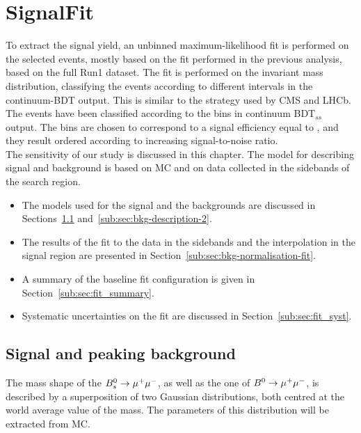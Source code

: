 \section{SignalFit}
\label{sec:SignalFit}

To extract the signal yield, an unbinned maximum-likelihood fit is performed on
the selected events, mostly based on the fit performed in the previous analysis, 
based on the full Run1 dataset. The fit is performed on the invariant mass distribution,
classifying the events according to different intervals in the continuum-BDT
output. This is similar to the strategy used by CMS and LHCb.\\
The events have been classified according to the  bins in
continuum BDT$_{ss}$ output. The bins are chosen to correspond
to a signal efficiency equal to , and they result ordered
according to increasing signal-to-noise ratio. \\
The sensitivity of our study is discussed in this chapter. The model for
describing signal and background is based on MC and on data collected in
the sidebands of the search region. 
\begin{itemize}
    \setlength{\itemsep}{0pt}%
    \setlength{\parskip}{0pt}%
\item The models used for the signal and the backgrounds are discussed in
Sections~\ref{sub:sec:signal-description}%
and~\ref{sub:sec:bkg-description-2}.
\item The results of the fit to the data in the sidebands and the interpolation
in the signal region are presented in Section~\ref{sub:sec:bkg-normalisation-fit}.
\item A summary of the baseline fit configuration is given in Section~\ref{sub:sec:fit_summary}.
\item Systematic uncertainties on the fit are discussed in Section~\ref{sub:sec:fit_syst}.
\end{itemize}

\subsection{Signal and peaking background}
\label{sub:sec:signal-description}
The mass shape of the {\bf {\boldmath $B_s^0 \to \mu^+\mu^-$}}, as well as the one of {\bf {\boldmath $B^0 \to \mu^+\mu^-$}},
is described by a superposition of two Gaussian distributions, 
both centred at the world average value of the mass.
The parameters of this distribution will be extracted from MC. %


